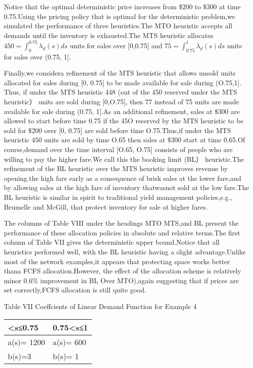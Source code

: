 Notice that the optimal deterministic price increases from \(\$ 200\) to
\(\$ 300\) at time 0.75.Using the pricing policy that is optimal for the
deterministic problem,we simulated the performance of three
heuristics.The MTO heuristic accepts all demands until the inventory is
exhausted.The MTS heuristic allocates
\(4 5 0 = \textstyle \int _ { 0 } ^ { 0 . 7 5 } \lambda _ { d } ( s ) d s\)
units for sales over {[}0,0.75{]} and
\(7 5 = \textstyle \int _ { 0 . 7 5 } ^ { 1 } \lambda _ { d } ( s ) d s\)
units for sales over (0.75, 1{]}.

Finally,we considera refinement of the MTS heuristic that allows unsold
units allocated for sales during {[}0, 0.75{]} to be made available for
sale during (O.75,1{]}. Thus, if under the MTS heuristic 448 (out of the
450 reserved under the MTS heuristic） units are sold during
{[}0,O.75{]}, then 77 instead of 75 units are made available for sale
during (0.75, 1{]}.As an additional refinement, sales at \(\$ 300\) are
allowed to start before time 0.75 if the 45O reserved by the MTS
heuristic to be sold for \(\$ 200\) over {[}0, 0.75{]} are sold before
time O.75.Thus,if under the MTS heuristic 450 units are sold by time
O.65 then sales at \(\$ 300\) start at time 0.65.Of course,demand over
the time interval {[}O.65, O.75{]} consists of people who are willing to
pay the higher fare.We call this the booking limit (BL） heuristic.The
refinement of the BL heuristic over the MTS heuristic improves revenue
by opening.the high fare early as a consequence of brisk sales at the
lower fare,and by allowing sales at the high fare of inventory
thatwasnot sold at the low fare.The BL heuristic is similar in spirit to
traditional yield management policies,e.g., Brumelle and McGill, that
protect inventory for sale at higher fares.

The columns of Table VIII under the headings MTO MTS,and BL present the
performance of these allocation policies in absolute and relative
terms.The first column of Table VII gives the deterministic upper
bound.Notice that all heuristics performed well, with the BL heuristic
having a slight advantage.Unlike most of the network examples,it appears
that protecting space works better thana FCFS allocation.However, the
effect of the allocation scheme is relatively minor \(0 . 6 \%\)
improvement in BL Over MTO),again suggesting that if prices are set
correctly,FCFS allocation is still quite good.

Table VII Coeffcients of Linear Demand Function for Example 4

\begin{longtable}[]{@{}|l|l|@{}}
\toprule\noalign{}
\endhead
\bottomrule\noalign{}
\endlastfoot
\hline
0\textless s≤0.75 & 0.75\textless s≤1 \\
\hline
a(s)= 1200 & a(s)= 600 \\
\hline
b(s)=3 & b(s)= 1 \\
\hline
\end{longtable}


